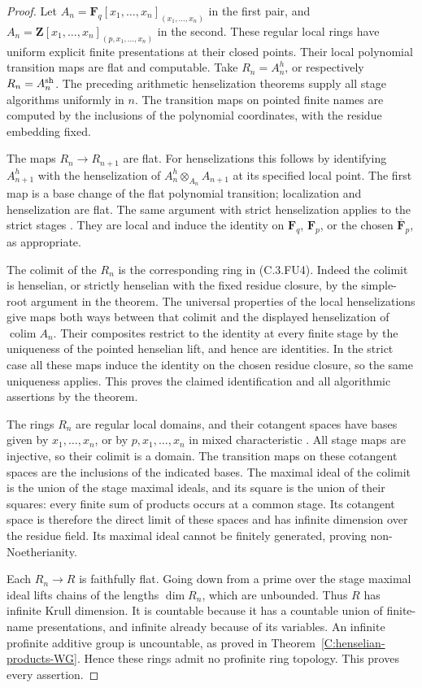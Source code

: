 \begin{proof}
Let $A_n=\mathbf F_q[x_1,\ldots,x_n]_{(x_1,\ldots,x_n)}$
in the first pair, and
$A_n=\mathbf Z[x_1,\ldots,x_n]_{(p,x_1,\ldots,x_n)}$
in the second.  These regular local rings have
uniform explicit finite presentations at their
closed points.  Their local polynomial transition
maps are flat and computable.
Take $R_n=A_n^h$, or respectively $R_n=A_n^{\rm sh}$.
The preceding arithmetic henselization theorems
supply all stage algorithms uniformly in $n$.
The transition maps on pointed finite names are
computed by the inclusions of the polynomial
coordinates, with the residue embedding fixed.

The maps $R_n\to R_{n+1}$ are flat.
For henselizations this follows by identifying
$A_{n+1}^h$ with the henselization of
$A_n^h\otimes_{A_n}A_{n+1}$ at its specified
local point.  The first map is a base change
of the flat polynomial transition; localization
and henselization are flat.
The same argument with strict henselization
applies to the strict stages
\cite[Section 10.155, Lemmas 10.155.8 and 10.155.12]
 {C-StacksFlatUnions}.
They are local and induce the identity on
$\mathbf F_q$, $\mathbf F_p$, or the chosen
$\overline{\mathbf F}_p$, as appropriate.

The colimit of the $R_n$ is the corresponding
ring in (C.3.FU4).  Indeed the colimit is
henselian, or strictly henselian with the fixed
residue closure, by the simple-root argument in
the theorem.  The universal properties of the
local henselizations give maps both ways between
that colimit and the displayed henselization
of $\operatorname*{colim}A_n$.
Their composites restrict to the identity at
every finite stage by the uniqueness of the
pointed henselian lift, and hence are identities.
In the strict case all these maps induce the
identity on the chosen residue closure, so the
same uniqueness applies.  This proves the
claimed identification and all algorithmic
assertions by the theorem.

The rings $R_n$ are regular local domains, and
their cotangent spaces have bases given by
$x_1,\ldots,x_n$, or by $p,x_1,\ldots,x_n$
in mixed characteristic
\cite[Lemmas 15.46.6 and 15.46.10, Section 15.46]
 {C-StacksFlatUnions}.
All stage maps are injective, so their colimit
is a domain.  The transition maps on these
cotangent spaces are the inclusions of the
indicated bases.  The maximal ideal of the
colimit is the union of the stage maximal
ideals, and its square is the union of their
squares: every finite sum of products occurs
at a common stage.  Its cotangent space is
therefore the direct limit of these spaces
and has infinite dimension over the residue
field.  Its maximal ideal cannot be finitely
generated, proving non-Noetherianity.

Each $R_n\to R$ is faithfully flat.  Going
down from a prime over the stage maximal ideal
lifts chains of the lengths $\dim R_n$, which
are unbounded.  Thus $R$ has infinite Krull
dimension.  It is countable because it has a
countable union of finite-name presentations,
and infinite already because of its variables.
An infinite profinite additive group is
uncountable, as proved in
Theorem~\ref{C:henselian-products-WG}.
Hence these rings admit no profinite ring
topology.  This proves every assertion.
\end{proof}
